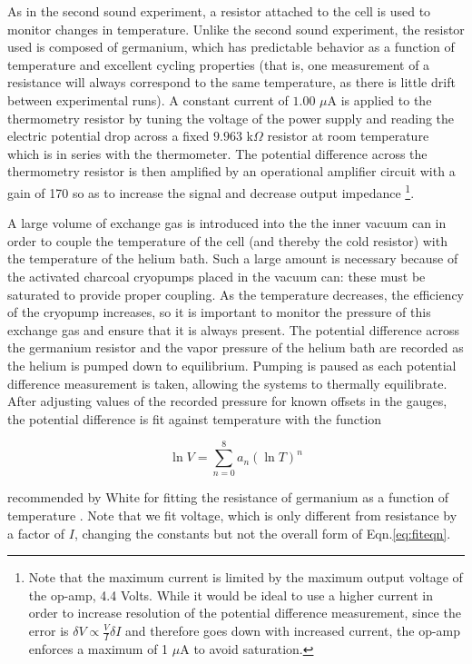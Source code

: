 As in the second sound experiment, a resistor attached to the cell is
used to monitor changes in temperature. Unlike the second sound
experiment, the resistor used is composed of germanium, which has
predictable behavior as a function of temperature and excellent
cycling properties (that is, one measurement of a resistance will
always correspond to the same temperature, as there is little drift
between experimental runs). A constant current of $1.00$ $\mu$A is
applied to the thermometry resistor by tuning the voltage of the power
supply and reading the electric potential drop across a fixed $9.963$
k$\Omega$ resistor at room temperature which is in series with the
thermometer. The potential difference across the thermometry resistor
is then amplified by an operational amplifier circuit with a gain of
170 so as to increase the signal and decrease output impedance
\footnote{Note that the maximum current is limited by the maximum
  output voltage of the op-amp, 4.4 Volts. While it would be ideal to
  use a higher current in order to increase resolution of the
  potential difference measurement, since the error is $\delta V
  \propto \frac{V}{I} \delta I$ and therefore goes down with increased
  current, the op-amp enforces a maximum of 1 $\mu$A to avoid
  saturation.}. 

A large volume of exchange gas is introduced into the the inner vacuum
can in order to couple the temperature of the cell (and thereby the
cold resistor) with the temperature of the helium bath. Such a large
amount is necessary because of the activated charcoal cryopumps
placed in the vacuum can: these must be saturated to provide proper
coupling. As the temperature decreases, the efficiency of the cryopump
increases, so it is important to monitor the pressure of this exchange
gas and ensure that it is always present. The potential difference
across the germanium resistor and the vapor pressure of the helium
bath are recorded as the helium is pumped down to equilibrium. Pumping
is paused as each potential difference measurement is taken, allowing
the systems to thermally equilibrate. After adjusting values of the
recorded pressure for known offsets in the gauges, the potential
difference is fit against temperature with the function

\begin{equation}
\label{eq:fiteqn}
\ln{V} = \sum_{n=0}^{8} a_{n} (\ln{T})^{n}
\end{equation}

recommended by White for fitting the resistance of germanium as a
function of temperature \cite{white}. Note that we fit voltage, which
is only different from resistance by a factor of $I$, changing the
constants but not the overall form of Eqn.\ref{eq:fiteqn}.

